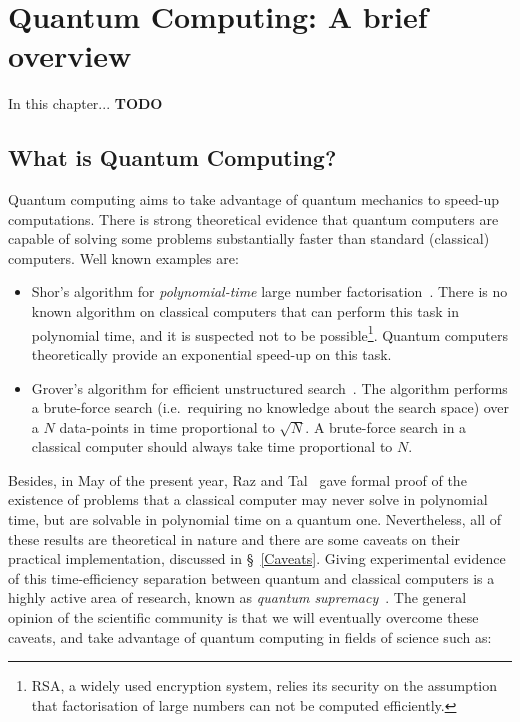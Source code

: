 \chapter{Quantum Computing: A brief overview}

In this chapter... \textbf{TODO}

\section{What is Quantum Computing?}

Quantum computing aims to take advantage of quantum mechanics to speed-up computations. There is strong theoretical evidence that quantum computers are capable of solving some problems substantially faster than standard (classical) computers. Well known examples are:

\begin{itemize} 
  \item Shor's algorithm for \textit{polynomial-time} large number factorisation~\cite{Shor}. There is no known algorithm on classical computers that can perform this task in polynomial time, and it is suspected not to be possible\footnote{RSA, a widely used encryption system, relies its security on the assumption that factorisation of large numbers can not be computed efficiently.}. Quantum computers theoretically provide an exponential speed-up on this task.
  \item Grover's algorithm for efficient unstructured search~\cite{Grover}. The algorithm performs a brute-force search (i.e.\ requiring no knowledge about the search space) over a \(N\) data-points in time proportional to \(\sqrt{N}\). A brute-force search in a classical computer should always take time proportional to \(N\).
\end{itemize}

Besides, in May of the present year, Raz and Tal~\cite{BQPSepPH} gave formal proof of the existence of problems that a classical computer may never solve in polynomial time, but are solvable in polynomial time on a quantum one. Nevertheless, all of these results are theoretical in nature and there are some caveats on their practical implementation, discussed in \S~\ref{Caveats}. Giving experimental evidence of this time-efficiency separation between quantum and classical computers is a highly active area of research, known as \textit{quantum supremacy}~\cite{QSupremacySurvey}. The general opinion of the scientific community is that we will eventually overcome these caveats, and take advantage of quantum computing in fields of science such as:


